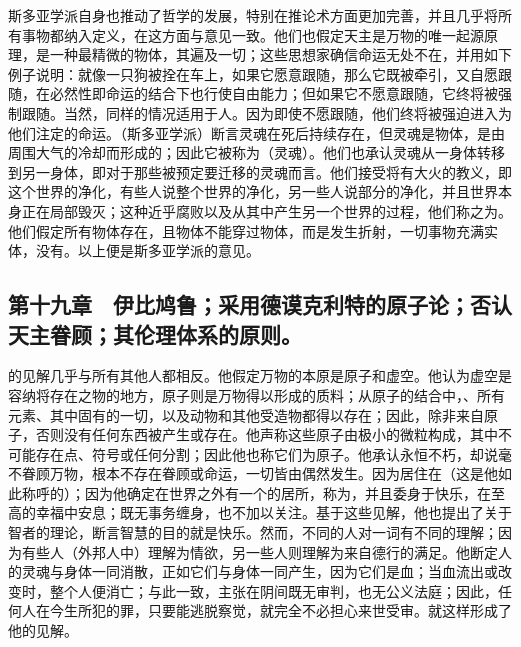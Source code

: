 斯多亚学派自身也推动了哲学的发展，特别在推论术方面更加完善，并且几乎将所有事物都纳入定义，在这方面与意见一致。他们也假定天主是万物的唯一起源原理，是一种最精微的物体，其遍及一切；这些思想家确信命运无处不在，并用如下例子说明：就像一只狗被拴在车上，如果它愿意跟随，那么它既被牵引，又自愿跟随，在必然性即命运的结合下也行使自由能力；但如果它不愿意跟随，它终将被强制跟随。当然，同样的情况适用于人。因为即使不愿跟随，他们终将被强迫进入为他们注定的命运。（斯多亚学派）断言灵魂在死后持续存在，但灵魂是物体，是由周围大气的冷却而形成的；因此它被称为（灵魂）。他们也承认灵魂从一身体转移到另一身体，即对于那些被预定要迁移的灵魂而言。他们接受将有大火的教义，即这个世界的净化，有些人说整个世界的净化，另一些人说部分的净化，并且世界本身正在局部毁灭；这种近乎腐败以及从其中产生另一个世界的过程，他们称之为。他们假定所有物体存在，且物体不能穿过物体，而是发生折射，一切事物充满实体，没有。以上便是斯多亚学派的意见。\par


\subsection{第十九章　伊比鸠鲁；采用德谟克利特的原子论；否认天主眷顾；其伦理体系的原则。}

的见解几乎与所有其他人都相反。他假定万物的本原是原子和虚空。他认为虚空是容纳将存在之物的地方，原子则是万物得以形成的质料；从原子的结合中，、所有元素、其中固有的一切，以及动物和其他受造物都得以存在；因此，除非来自原子，否则没有任何东西被产生或存在。他声称这些原子由极小的微粒构成，其中不可能存在点、符号或任何分割；因此他也称它们为原子。他承认永恒不朽，却说毫不眷顾万物，根本不存在眷顾或命运，一切皆由偶然发生。因为居住在（这是他如此称呼的）；因为他确定在世界之外有一个的居所，称为，并且委身于快乐，在至高的幸福中安息；既无事务缠身，也不加以关注。基于这些见解，他也提出了关于智者的理论，断言智慧的目的就是快乐。然而，不同的人对一词有不同的理解；因为有些人（外邦人中）理解为情欲，另一些人则理解为来自德行的满足。他断定人的灵魂与身体一同消散，正如它们与身体一同产生，因为它们是血；当血流出或改变时，整个人便消亡；与此一致，主张在阴间既无审判，也无公义法庭；因此，任何人在今生所犯的罪，只要能逃脱察觉，就完全不必担心来世受审。就这样形成了他的见解。\par

